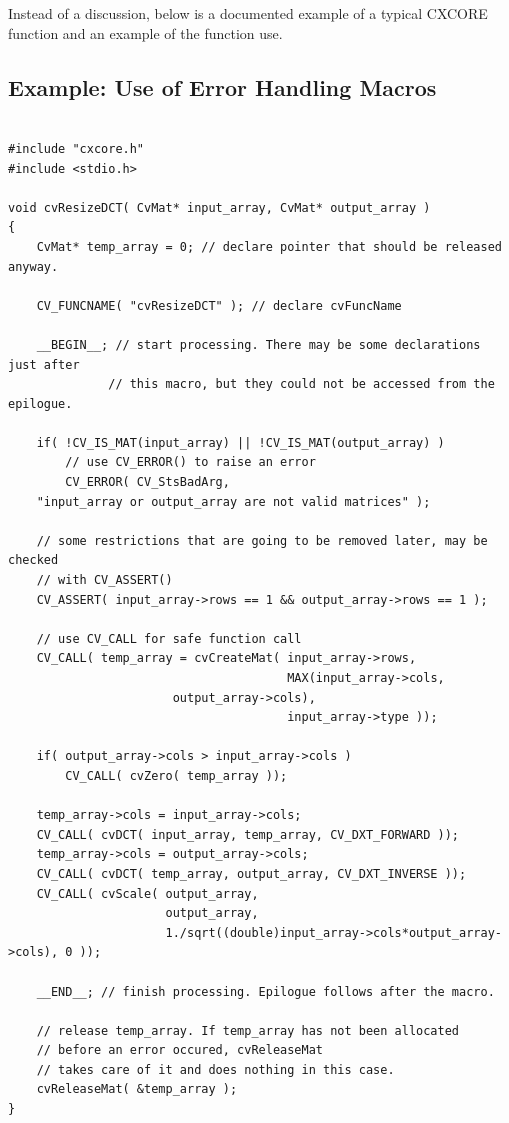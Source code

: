 Instead of a discussion, below is a documented example of a typical CXCORE function and an example of the function use.

\subsection{Example: Use of Error Handling Macros}
\begin{lstlisting}

#include "cxcore.h"
#include <stdio.h>

void cvResizeDCT( CvMat* input_array, CvMat* output_array )
{
    CvMat* temp_array = 0; // declare pointer that should be released anyway.

    CV_FUNCNAME( "cvResizeDCT" ); // declare cvFuncName

    __BEGIN__; // start processing. There may be some declarations just after 
              // this macro, but they could not be accessed from the epilogue.

    if( !CV_IS_MAT(input_array) || !CV_IS_MAT(output_array) )
        // use CV_ERROR() to raise an error
        CV_ERROR( CV_StsBadArg, 
	"input_array or output_array are not valid matrices" );

    // some restrictions that are going to be removed later, may be checked 
    // with CV_ASSERT()
    CV_ASSERT( input_array->rows == 1 && output_array->rows == 1 );

    // use CV_CALL for safe function call
    CV_CALL( temp_array = cvCreateMat( input_array->rows,
                                       MAX(input_array->cols,
				       output_array->cols),
                                       input_array->type ));

    if( output_array->cols > input_array->cols )
        CV_CALL( cvZero( temp_array ));

    temp_array->cols = input_array->cols;
    CV_CALL( cvDCT( input_array, temp_array, CV_DXT_FORWARD ));
    temp_array->cols = output_array->cols;
    CV_CALL( cvDCT( temp_array, output_array, CV_DXT_INVERSE ));
    CV_CALL( cvScale( output_array,
                      output_array,
                      1./sqrt((double)input_array->cols*output_array->cols), 0 ));

    __END__; // finish processing. Epilogue follows after the macro.

    // release temp_array. If temp_array has not been allocated
    // before an error occured, cvReleaseMat
    // takes care of it and does nothing in this case.
    cvReleaseMat( &temp_array );
}


\end{lstlisting}
